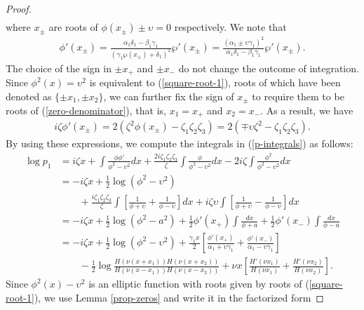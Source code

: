 \documentclass[12pt,reqno]{amsart}
\numberwithin{equation}{section}
\begin{document}
\begin{proof}
\begin{align*}
\end{align*}
where $x_{\pm}$ are roots of $\phi(x_{\pm}) \pm \upsilon = 0$ respectively. We note that 
\begin{align*}
\phi'(x_{\pm}) = \frac{\alpha_1 \delta_1 - \beta_1 \gamma_1}{(\gamma_1 \wp(x_{\pm}) + \delta_1)^2} \wp'(x_{\pm}) = \frac{(\alpha_1 \pm \upsilon \gamma_1)^2}{\alpha_1 \delta_1 - \beta_1 \gamma_1} \wp'(x_{\pm}). 
\end{align*}
The choice of the sign in $\pm x_+$ and $\pm x_-$ do not change the outcome of integration. Since $\phi^2(x) = \upsilon^2$ is equivalent to (\ref{square-root-1}), roots of which have been denoted as $\{ \pm x_1, \pm x_2\}$, we can further fix the sign of $x_{\pm}$ to require them to be roots 
of (\ref{zero-denominator}), that is, $x_1 = x_+$ and $x_2 = x_-$. As a result, we have 
\begin{align*}
i \zeta \phi'(x_{\pm}) = 2 (\zeta^2 \phi(x_{\pm}) - \zeta_1 \zeta_2 \zeta_3) =  2(\mp \upsilon \zeta^2 - \zeta_1 \zeta_2 \zeta_3).
\end{align*}
By using these expressions, we compute the integrals in (\ref{p-integrals}) as follows:
\begin{align*}
\log p_1 &= i \zeta x + \int \frac{\phi \phi' }{\phi^2 - \upsilon^2} dx
+ \frac{2i \zeta_1 \zeta_2 \zeta_3}{\zeta} \int \frac{\phi}{\phi^2 - \upsilon^2} dx 
- 2 i \zeta \int \frac{\phi^2}{\phi^2 - \upsilon^2} dx \\
&= -i \zeta x + \frac{1}{2} \log(\phi^2 - \upsilon^2) \\
& \qquad 
+ \frac{i \zeta_1 \zeta_2 \zeta_3}{\zeta} \int \left[ \frac{1}{\phi + \upsilon} + \frac{1}{\phi - \upsilon} \right] dx 
+ i \zeta \upsilon  \int \left[ \frac{1}{\phi + \upsilon} - \frac{1}{\phi - \upsilon} \right] dx \\
&= -i \zeta x + \frac{1}{2} \log(\phi^2 - a^2)
+ \frac{1}{2} \phi'(x_+) \int \frac{dx}{\phi + a}  
+ \frac{1}{2} \phi'(x_-)  \int \frac{dx}{\phi - a} \\
&= -i \zeta x + \frac{1}{2} \log(\phi^2 - \upsilon^2)
+ \frac{\gamma_1 x}{2} \left[ \frac{\phi'(x_+)}{\alpha_1 + \upsilon \gamma_1} 
+ \frac{\phi'(x_-)}{\alpha_1 - \upsilon \gamma_1} \right] \\
& \qquad -\frac{1}{2} \log \frac{H(\nu(x+x_1)) H(\nu (x+x_2))}{H(\nu (x-x_1)) H(\nu (x-x_2))} + \nu x \left[ \frac{H'(\nu x_1)}{H(\nu x_1)} + \frac{H'(\nu x_2)}{H(\nu x_2)} \right].
\end{align*}
Since $\phi^2(x) - \upsilon^2$ is an elliptic function with roots given by roots of (\ref{square-root-1}), we use Lemma \ref{prop-zeros} and write it in the factorized form 

\end{proof}
\end{document}
